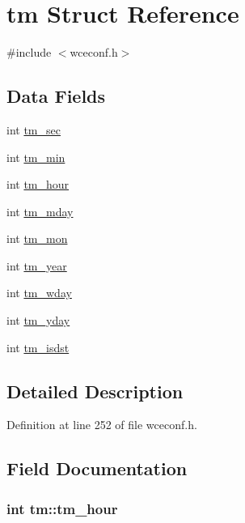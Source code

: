\hypertarget{structtm}{\section{tm Struct Reference}
\label{structtm}
}


{\ttfamily \#include $<$wceconf.\+h$>$}

\subsection*{Data Fields}
\begin{DoxyCompactItemize}
\item 
int \hyperlink{structtm_a4d098a9a5c03a00b2ee61e10851de81e}{tm\+\_\+sec}
\item 
int \hyperlink{structtm_af414eb7c86cc3099595211eee4d4211b}{tm\+\_\+min}
\item 
int \hyperlink{structtm_a3e7ca4e37f1abcaf56b8a916c38eb9fe}{tm\+\_\+hour}
\item 
int \hyperlink{structtm_ab8d8904bad43b0c8b96e61941c5b5310}{tm\+\_\+mday}
\item 
int \hyperlink{structtm_a112ac36fa2f593777138a417cf031e17}{tm\+\_\+mon}
\item 
int \hyperlink{structtm_a33adf78fd6476b2120ce3b9c4a852053}{tm\+\_\+year}
\item 
int \hyperlink{structtm_afe81a8c46f1c693c43f259b288859f4f}{tm\+\_\+wday}
\item 
int \hyperlink{structtm_a93a0ba77cc23796df84405dcbcc57eb1}{tm\+\_\+yday}
\item 
int \hyperlink{structtm_a5645ca0580c8ab2c24f6c2965d9c9f9c}{tm\+\_\+isdst}
\end{DoxyCompactItemize}


\subsection{Detailed Description}


Definition at line 252 of file wceconf.\+h.



\subsection{Field Documentation}
\hypertarget{structtm_a3e7ca4e37f1abcaf56b8a916c38eb9fe}{
\subsubsection[{tm\+\_\+hour}]{\setlength{\rightskip}{0pt plus 5cm}int tm\+::tm\+\_\+hour}}\label{structtm_a3e7ca4e37f1abcaf56b8a916c38eb9fe}


